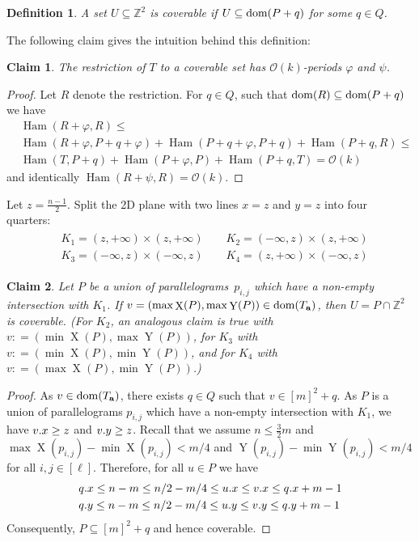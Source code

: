 \documentclass[a4paper,11pt]{article}
\newtheorem{definition}{Definition}[section]
\newtheorem{claim}{Claim}[section]
\newcommand{\Z}{\mathbb{Z}}
\renewcommand{\O}{\mathcal{O}}
\newcommand{\Ta}{T_\mathbf{a}}
\renewcommand{\phi}{\varphi}
\DeclareMathOperator*{\X}{X}
\DeclareMathOperator*{\Y}{Y}
\DeclareMathOperator*{\Ham}{Ham}
\begin{document}
\begin{definition}
A set $U \subseteq \Z^2$ is \emph{coverable} if $U \subseteq \operatorname*{dom}(P + q)$ for some $q \in Q$.
\end{definition}

The following claim gives the intuition behind this definition:

\begin{claim}\label{coverable is periodic}
	The restriction of $T$ to a coverable set has $\O(k)$-periods $\phi$ and $\psi$.
\end{claim}	
	\begin{proof}
		Let $R$ denote the restriction. For $q \in Q$, such that $\operatorname*{dom}(R) \subseteq \operatorname*{dom}(P + q)$ we have
\begin{align*}
&\Ham(R + \phi, R) \le \\
&\Ham(R + \phi, P + q + \phi) + \Ham(P + q + \phi, P + q) + \Ham(P + q, R) \le \\
&\Ham(T, P + q) + \Ham(P + \phi, P) + \Ham(P + q, T) = \O(k)
\end{align*}
and identically $\Ham(R + \psi, R) = \O(k)$.
\end{proof}

Let $z = \frac{n - 1}{2}$. Split the 2D plane with two lines $x = z$ and $y = z$ into four quarters:
\begin{align}
\label{eq:quarters}
\begin{split}
&K_1 = (z, +\infty) \times (z, +\infty) \quad\quad K_2 = (-\infty, z) \times (z, +\infty)\\
&K_3 = (-\infty, z) \times (-\infty, z) \quad\quad K_4 = (z, +\infty) \times (-\infty, z)
\end{split}
\end{align}


\begin{claim}\label{coverable}
Let $P$ be a union of parallelograms~$p_{i,j}$ which have a non-empty intersection with $K_1$. If $v = (\max \X(P), \max \Y(P)) \in \d{\Ta}$, then $U = P \cap \Z^2$ is coverable. (For $K_2$, an analogous claim is true with $v: = (\min \X(P), \max \Y(P))$, for $K_3$ with $v : = (\min \X(P), \min \Y(P))$, and for $K_4$ with $v : = (\max \X(P), \min \Y(P))$.)
\end{claim}
\begin{proof}
As $v \in \d{\Ta}$, there exists $q \in Q$ such that $v \in [m]^2 + q$. As $P$ is a union of parallelograms $p_{i,j}$ which have a non-empty intersection with $K_1$, we have $v.x \ge z$ and $v.y \ge z$. Recall that we assume $n \le \frac{3}{2} m$ and $\max \X(p_{i, j}) - \min \X(p_{i, j}) < m / 4$ and $\Y(p_{i, j}) - \min \Y(p_{i, j}) < m / 4$ for all $i, j \in [\ell]$. Therefore, for all $u \in P$ we have
\begin{align*}
&q.x \le n-m \le n/2-m/4 \le u.x \le v.x \le q.x + m-1\\
&q.y \le n-m \le n/2-m/4 \le u.y \le v.y \le q.y + m-1 
\end{align*}
\noindent Consequently, $P \subseteq [m]^2+q$ and hence coverable.
\end{proof}
\end{document}
